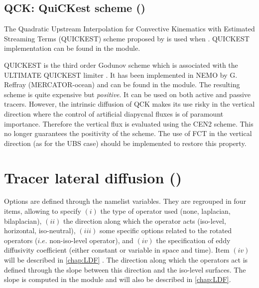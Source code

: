 \documentclass[../tex_main/NEMO_manual]{subfiles}
\begin{document}
\subsection{QCK: QuiCKest scheme (\protect{})}
\label{subsec:TRA_adv_qck}

The Quadratic Upstream Interpolation for Convective Kinematics with 
Estimated Streaming Terms (QUICKEST) scheme proposed by \citet{Leonard1979} 
is used when . 
QUICKEST implementation can be found in the  module.

QUICKEST is the third order Godunov scheme which is associated with the ULTIMATE QUICKEST 
limiter \citep{Leonard1991}. It has been implemented in NEMO by G. Reffray 
(MERCATOR-ocean) and can be found in the  module.
The resulting scheme is quite expensive but \emph{positive}. 
It can be used on both active and passive tracers. 
However, the intrinsic diffusion of QCK makes its use risky in the vertical 
direction where the control of artificial diapycnal fluxes is of paramount importance. 
Therefore the vertical flux is evaluated using the CEN2 scheme. 
This no longer guarantees the positivity of the scheme. 
The use of FCT in the vertical direction (as for the UBS case) should be implemented 
to restore this property.



\section{Tracer lateral diffusion (\protect{})}
\label{sec:TRA_ldf}

 
Options are defined through the  namelist variables.
They are regrouped in four items, allowing to specify 
$(i)$   the type of operator used (none, laplacian, bilaplacian), 
$(ii)$  the direction along which the operator acts (iso-level, horizontal, iso-neutral), 
$(iii)$ some specific options related to the rotated operators ($i.e.$ non-iso-level operator), and 
$(iv)$  the specification of eddy diffusivity coefficient (either constant or variable in space and time).
Item $(iv)$ will be described in \autoref{chap:LDF} .
The direction along which the operators act is defined through the slope between this direction and the iso-level surfaces.
The slope is computed in the  module and will also be described in \autoref{chap:LDF}. 
\end{document}
